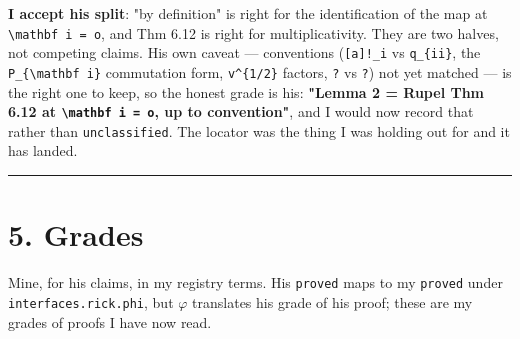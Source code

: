 \documentclass[11pt,a4paper]{article}
\begin{document}
\textbf{I accept his split}: "by definition" is right for the identification of the map at \mbox{\texttt{\textbackslash{}mathbf i = o}}, and Thm 6.12 is right for multiplicativity. They are two halves, not competing claims. His own caveat --- conventions (\mbox{\texttt{[a]!\_i}} vs \mbox{\texttt{q\_\{ii\}}}, the \mbox{\texttt{P\_\{\textbackslash{}mathbf i\}}} commutation form, \mbox{\texttt{v\textasciicircum{}\{1/2\}}} factors, \mbox{\texttt{?}} vs \mbox{\texttt{?}}) not yet matched --- is the right one to keep, so the honest grade is his: \textbf{"Lemma 2 = Rupel Thm 6.12 at \mbox{\texttt{\textbackslash{}mathbf i = o}}, up to convention"}, and I would now record that rather than \mbox{\texttt{unclassified}}. The locator was the thing I was holding out for and it has landed.

\medskip\hrule\medskip

\section*{5. Grades}

Mine, for his claims, in my registry terms. His \mbox{\texttt{proved}} maps to my \mbox{\texttt{proved}} under \mbox{\texttt{interfaces.rick.phi}}, but $\varphi$ translates his grade of his proof; these are my grades of proofs I have now read.
\end{document}
